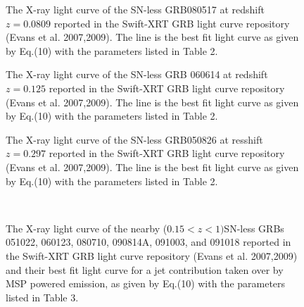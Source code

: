 \documentclass[twocolumn]{aastex61}
\begin{document}
\begin{figure}[]
\centering
\caption{The X-ray light curve of the SN-less GRB080517 
at redshift $z=0.0809$ reported in the Swift-XRT GRB 
light curve repository (Evans et al. 2007,2009). 
The line is the best fit light curve as given by Eq.(10)
with the parameters listed in Table 2.}     
\label{Fig2}                                                                       
\end{figure}

\begin{figure}[]
\centering
\caption{The X-ray light curve of the SN-less GRB 060614 
at redshift $z=0.125$
reported in the Swift-XRT GRB light curve repository (Evans et al.
2007,2009). The line is the best fit light curve as given by 
Eq.(10) with the parameters listed in Table 2.} 
\label{Fig3}
\end{figure} 

\begin{figure}[]
\centering
\caption{The X-ray light curve of the SN-less GRB050826 
at resshift $z=0.297$  
reported in the Swift-XRT GRB light curve repository (Evans 
et al. 2007,2009). 
The line  is the best fit light curve as given by Eq.(10)
with the parameters listed in Table 2.}     
\label{Fig4}                                                                       
\end{figure}

\begin{figure}[]
\centering
\vbox{
\hbox{
}}
\vbox{
\hbox{ 
}}
\vbox{
\hbox{
}}
\caption{The X-ray light curve of the nearby ($0.15<z<1) $SN-less GRBs 
051022, 060123, 080710,  090814A, 091003, and 091018  
reported in the Swift-XRT GRB light curve repository 
(Evans et al. 2007,2009)
and their best fit light curve for a jet contribution taken over
by MSP powered emission, as given by Eq.(10) with the parameters
listed in Table 3.}
\label{Fig5}
\end{figure}
\end{document}
